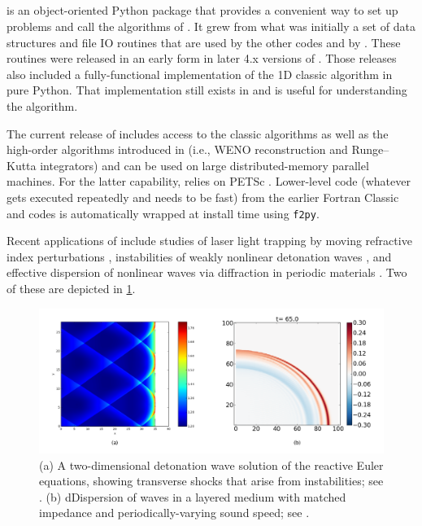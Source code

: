 %
%
%

\subsection{\pyclaw} \label{sec:pyclaw}
\pyclaw is an object-oriented Python package that provides a convenient way
to set up problems and call the algorithms of \clawpack.  It grew
from what was initially a set of data structures and file IO routines that are
used by the other \clawpack codes and by \visclaw.  These routines were released in
an early form in later 4.x versions of \clawpack.  Those releases also
included a fully-functional implementation of the 1D classic algorithm
in pure Python. That implementation still exists in \pyclaw and is useful
for understanding the algorithm.

The current release of \pyclaw includes access to the classic algorithms as well
as the high-order algorithms introduced in \sharpclaw \cite{2013_sharpclaw} (i.e., WENO
reconstruction and Runge--Kutta integrators) and can be used on large
distributed-memory parallel machines.  For the latter capability, \pyclaw
relies on PETSc \cite{petsc-user-ref}.
Lower-level code (whatever gets executed
repeatedly and needs to be fast) from the earlier Fortran Classic and \sharpclaw
codes is automatically wrapped at install time using \texttt{f2py}.

Recent applications of \pyclaw include studies of laser light trapping by moving
refractive index perturbations \cite{sanroman_thesis}, instabilities of weakly nonlinear detonation
waves \cite{faria2015qualitative}, and effective dispersion of nonlinear waves via diffraction in
periodic materials \cite{2015_diffractons}.  Two of these are depicted in
\cref{fig:pyclaw-apps}.

\begin{figure}
\begin{center}
\includegraphics[width=\textwidth]{figures/final_submission/Fig8}
\end{center}
\caption{\label{fig:pyclaw-apps}
(a) A two-dimensional detonation wave solution of the reactive Euler equations,
showing transverse shocks that arise from instabilities; see \cite{faria2015qualitative}.
(b) dDispersion of waves in a layered medium with matched impedance and periodically-varying
sound speed; see \cite{2015_diffractons}.}
\end{figure}


